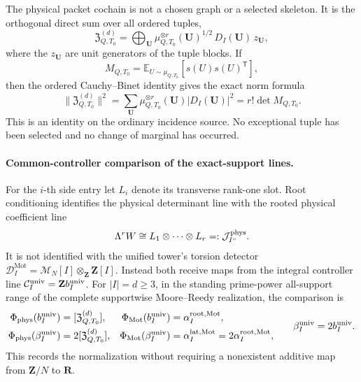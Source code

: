 \documentclass[11pt]{article}
\newcommand{\Mot}{\mathrm{Mot}}
\begin{document}
The physical packet cochain is not a chosen graph or a selected skeleton.  It
is the orthogonal direct sum over all ordered tuples,
\begin{equation}\label{eq:rooted-packet-cochain}
 \mathfrak Z^{(d)}_{Q,T_0}
 =\bigoplus_{\mathbf U}
 \mu_{Q,T_0}^{\otimes r}(\mathbf U)^{1/2}\,
 D_I(\mathbf U)\,z_{\mathbf U},
\end{equation}
where the \(z_{\mathbf U}\) are unit generators of the tuple blocks.  If
\[
 M_{Q,T_0}=\mathbb E_{U\sim\mu_{Q,T_0}}
       [s(U)s(U)^{\mathsf T}],
\]
then the ordered Cauchy--Binet identity gives the exact norm formula
\begin{equation}\label{eq:packet-cauchy-binet}
 \boxed{
 \|\mathfrak Z^{(d)}_{Q,T_0}\|^2
 =\sum_{\mathbf U}\mu_{Q,T_0}^{\otimes r}(\mathbf U)
       |D_I(\mathbf U)|^2
 =r!\det M_{Q,T_0}.}
\end{equation}
This is an identity on the ordinary incidence source.  No exceptional tuple
has been selected and no change of marginal has occurred.

\paragraph{Common-controller comparison of the exact-support lines.}
For the \(i\)-th side entry let \(L_i\) denote its transverse rank-one slot.
Root conditioning identifies the physical determinant line with the rooted
physical coefficient line
\begin{equation}\label{eq:determinant-motivic-line}
 \Lambda^r W
 \cong L_1\otimes\cdots\otimes L_r
 =:\mathcal J_{I^\circ}^{\rm phys}.
\end{equation}
It is not identified with the unified tower's torsion detector
\(\mathcal D_I^{\Mot}=\mathcal M_N[I]\otimes_{\mathbf Z}\mathbf Z[I]\).
Instead both receive maps from the integral controller line
\(\mathcal C_I^{\rm univ}=\mathbf Z b_I^{\rm univ}\).  For
\(|I|=d\ge3\), in the standing prime-power all-support range of the complete supportwise
Moore--Reedy realization, the comparison is
\begin{equation}\label{eq:normalized-controller-comparison}
 \begin{aligned}
 \Phi_{\rm phys}(b_I^{\rm univ})
   &=[\mathfrak Z^{(d)}_{Q,T_0}],
 &\Phi_{\Mot}(b_I^{\rm univ})
   &=\alpha_I^{\rm root,\Mot},\\
 \Phi_{\rm phys}(\beta_I^{\rm univ})
   &=2[\mathfrak Z^{(d)}_{Q,T_0}],
 &\Phi_{\Mot}(\beta_I^{\rm univ})
   &=\alpha_I^{\rm lat,\Mot}
     =2\alpha_I^{\rm root,\Mot},
 \end{aligned}
 \qquad
 \beta_I^{\rm univ}=2b_I^{\rm univ}.
\end{equation}
This records the normalization without requiring a nonexistent additive map
from \(\mathbf Z/N\) to \(\mathbf R\).
\end{document}
